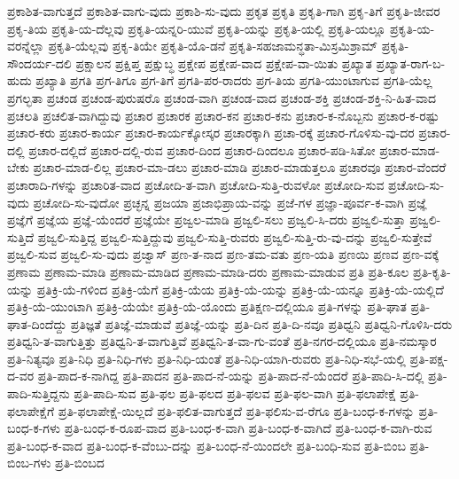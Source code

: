 {ಪ್ರಕಾಶಿತ-ವಾಗುತ್ತದೆ
ಪ್ರಕಾಶಿತ-ವಾಗು-ವುದು
ಪ್ರಕಾಶಿ-ಸು-ವುದು
ಪ್ರಕೃತ
ಪ್ರಕೃತಿ
ಪ್ರಕೃತಿ-ಗಾಗಿ
ಪ್ರಕೃ-ತಿಗೆ
ಪ್ರಕೃತಿ-ಜೀವರ
ಪ್ರಕೃ-ತಿಯ
ಪ್ರಕೃತಿ-ಯ-ದೆಲ್ಲವು
ಪ್ರಕೃತಿ-ಯನ್ನರಿ-ಯುವೆ
ಪ್ರಕೃತಿ-ಯನ್ನು
ಪ್ರಕೃತಿ-ಯಲ್ಲಿ
ಪ್ರಕೃತಿ-ಯಲ್ಲೂ
ಪ್ರಕೃತಿ-ಯ-ವರನ್ನೆಲ್ಲಾ
ಪ್ರಕೃತಿ-ಯೆಲ್ಲವು
ಪ್ರಕೃ-ತಿಯೇ
ಪ್ರಕೃತಿ-ಯೊ-ಡನೆ
ಪ್ರಕೃತಿ-ಸಹಜಾಮನ್ಧತಾ-ಮಿಸ್ರಮಿಶ್ರಾಮ್
ಪ್ರಕೃತಿ-ಸೌಂದರ್ಯ-ದಲಿ
ಪ್ರಕ್ಷಾಲನ
ಪ್ರಕ್ಷಿಪ್ತ
ಪ್ರಕ್ಷುಬ್ಧ
ಪ್ರಕ್ಷೇಪ
ಪ್ರಕ್ಷೇಪ-ವಾದ
ಪ್ರಕ್ಷೇಪ-ವಾ-ಯಿತು
ಪ್ರಖ್ಯಾತ
ಪ್ರಖ್ಯಾತ-ರಾಗ-ಬ-ಹುದು
ಪ್ರಖ್ಯಾತಿ
ಪ್ರಗತಿ
ಪ್ರಗ-ತಿಗೂ
ಪ್ರಗ-ತಿಗೆ
ಪ್ರಗತಿ-ಪರ-ರಾದರು
ಪ್ರಗ-ತಿಯ
ಪ್ರಗತಿ-ಯುಂಟಾಗುವ
ಪ್ರಗತಿ-ಯೆಲ್ಲ
ಪ್ರಗಲ್ಭತಾ
ಪ್ರಚಂಡ
ಪ್ರಚಂಡ-ಪುರುಷರೊ
ಪ್ರಚಂಡ-ವಾಗಿ
ಪ್ರಚಂಡ-ವಾದ
ಪ್ರಚಂಡ-ಶಕ್ತಿ
ಪ್ರಚಂಡ-ಶಕ್ತಿ-ನಿ-ಹಿತ-ವಾದ
ಪ್ರಚಲತಿ
ಪ್ರಚಲಿತ-ವಾಗಿದ್ದುವು
ಪ್ರಚಾರ
ಪ್ರಚಾರಕ
ಪ್ರಚಾರ-ಕನ
ಪ್ರಚಾರ-ಕನು
ಪ್ರಚಾರ-ಕ-ನೊಬ್ಬನು
ಪ್ರಚಾರ-ಕ-ರಷ್ಟು
ಪ್ರಚಾರ-ಕರು
ಪ್ರಚಾರ-ಕಾರ್ಯ
ಪ್ರಚಾರ-ಕಾರ್ಯಕ್ಕೋಸ್ಕರ
ಪ್ರಚಾರಕ್ಕಾಗಿ
ಪ್ರಚಾ-ರಕ್ಕೆ
ಪ್ರಚಾರ-ಗೊಳಿಸು-ವು-ದರ
ಪ್ರಚಾರ-ದಲ್ಲಿ
ಪ್ರಚಾರ-ದಲ್ಲಿದೆ
ಪ್ರಚಾರ-ದಲ್ಲಿ-ರುವ
ಪ್ರಚಾರ-ದಿಂದ
ಪ್ರಚಾರ-ದಿಂದಲೂ
ಪ್ರಚಾರ-ಪಡಿ-ಸಿತೋ
ಪ್ರಚಾರ-ಮಾಡ-ಬೇಕು
ಪ್ರಚಾರ-ಮಾಡ-ಲಿಲ್ಲ
ಪ್ರಚಾರ-ಮಾ-ಡಲು
ಪ್ರಚಾರ-ಮಾಡಿ
ಪ್ರಚಾರ-ಮಾಡುತ್ತಲೂ
ಪ್ರಚಾರವೂ
ಪ್ರಚಾರ-ವೆಂದರೆ
ಪ್ರಚಾರಾದಿ-ಗಳನ್ನು
ಪ್ರಚಾರಿತ-ವಾದ
ಪ್ರಚೋದಿ-ತ-ವಾಗಿ
ಪ್ರಚೋದಿ-ಸುತ್ತಿ-ರುವಳೋ
ಪ್ರಚೋದಿ-ಸುವ
ಪ್ರಚೋದಿ-ಸು-ವುದು
ಪ್ರಚೋದಿ-ಸು-ವುದೋ
ಪ್ರಚ್ಛನ್ನ
ಪ್ರಜಯಾ
ಪ್ರಜಾಭಿಪ್ರಾಯ-ವನ್ನು
ಪ್ರಜೆ-ಗಳ
ಪ್ರಜ್ಞಾ-ಪೂರ್ವ-ಕ-ವಾಗಿ
ಪ್ರಜ್ಞೆ
ಪ್ರಜ್ಞೆಗೆ
ಪ್ರಜ್ಞೆಯ
ಪ್ರಜ್ಞೆ-ಯೆಂದರೆ
ಪ್ರಜ್ಞೆಯೇ
ಪ್ರಜ್ವಲ-ಮಾಡಿ
ಪ್ರಜ್ವಲಿ-ಸಲು
ಪ್ರಜ್ವಲಿ-ಸಿ-ದರು
ಪ್ರಜ್ವಲಿ-ಸುತ್ತಾ
ಪ್ರಜ್ವಲಿ-ಸುತ್ತಿದೆ
ಪ್ರಜ್ವಲಿ-ಸುತ್ತಿದ್ದ
ಪ್ರಜ್ವಲಿ-ಸುತ್ತಿದ್ದುವು
ಪ್ರಜ್ವಲಿ-ಸುತ್ತಿ-ರುವರು
ಪ್ರಜ್ವಲಿ-ಸುತ್ತಿ-ರು-ವು-ದನ್ನು
ಪ್ರಜ್ವಲಿ-ಸುತ್ತೇವೆ
ಪ್ರಜ್ವಲಿ-ಸುವ
ಪ್ರಜ್ವಲಿ-ಸು-ವುದು
ಪ್ರಜ್ವಾಸ್
ಪ್ರಣ-ತ-ನಾದ
ಪ್ರಣ-ತಮ-ವತು
ಪ್ರಣ-ಯತಿ
ಪ್ರಣಯಿ
ಪ್ರಣವ
ಪ್ರಣ-ವಕ್ಕೆ
ಪ್ರಣಾಮ
ಪ್ರಣಾಮ-ಮಾಡಿ
ಪ್ರಣಾಮ-ಮಾಡಿದ
ಪ್ರಣಾಮ-ಮಾಡಿ-ದರು
ಪ್ರಣಾಮ-ಮಾಡುವ
ಪ್ರತಿ
ಪ್ರತಿ-ಕೂಲ
ಪ್ರತಿ-ಕೃತಿ-ಯನ್ನು
ಪ್ರತಿಕ್ರಿ-ಯೆ-ಗಳಿಂದ
ಪ್ರತಿಕ್ರಿ-ಯೆಗೆ
ಪ್ರತಿಕ್ರಿ-ಯೆಯ
ಪ್ರತಿಕ್ರಿ-ಯೆ-ಯನ್ನು
ಪ್ರತಿಕ್ರಿ-ಯೆ-ಯನ್ನೂ
ಪ್ರತಿಕ್ರಿ-ಯೆ-ಯಲ್ಲಿದೆ
ಪ್ರತಿಕ್ರಿ-ಯೆ-ಯುಂಟಾಗಿ
ಪ್ರತಿಕ್ರಿ-ಯೆಯೇ
ಪ್ರತಿಕ್ರಿ-ಯೆ-ಯೊಂದು
ಪ್ರತಿಕ್ಷಣ-ದಲ್ಲಿಯೂ
ಪ್ರತಿ-ಗಳನ್ನು
ಪ್ರತಿ-ಘಾತ
ಪ್ರತಿ-ಘಾತ-ದಿಂದೆದ್ದು
ಪ್ರತಿಜ್ಞತೆ
ಪ್ರತಿಜ್ಞೆ-ಮಾಡುವೆ
ಪ್ರತಿಜ್ಞೆ-ಯನ್ನು
ಪ್ರತಿ-ದಿನ
ಪ್ರತಿ-ದಿ-ನವೂ
ಪ್ರತಿಧ್ವನಿ
ಪ್ರತಿಧ್ವನಿ-ಗೊಳಿಸಿ-ದರು
ಪ್ರತಿಧ್ವನಿ-ತ-ವಾಗುತ್ತಿತ್ತು
ಪ್ರತಿಧ್ವನಿ-ತ-ವಾಗುತ್ತಿವೆ
ಪ್ರತಿಧ್ವನಿ-ತ-ವಾ-ಗು-ವಂತೆ
ಪ್ರತಿ-ನಗರ-ದಲ್ಲಿಯೂ
ಪ್ರತಿ-ನಮಸ್ಕಾರ
ಪ್ರತಿ-ನಿತ್ಯವೂ
ಪ್ರತಿ-ನಿಧಿ
ಪ್ರತಿ-ನಿಧಿ-ಗಳು
ಪ್ರತಿ-ನಿಧಿ-ಯಂತೆ
ಪ್ರತಿ-ನಿಧಿ-ಯಾಗಿ-ರುವರು
ಪ್ರತಿ-ನಿಧಿ-ಸಭೆ-ಯಲ್ಲಿ
ಪ್ರತಿ-ಪಕ್ಷ-ದ-ವರ
ಪ್ರತಿ-ಪಾದ-ಕ-ನಾಗಿದ್ದ
ಪ್ರತಿ-ಪಾದನ
ಪ್ರತಿ-ಪಾದ-ನೆ-ಯನ್ನು
ಪ್ರತಿ-ಪಾದ-ನೆ-ಯೆಂದರೆ
ಪ್ರತಿ-ಪಾದಿ-ಸಿ-ದಲ್ಲಿ
ಪ್ರತಿ-ಪಾದಿ-ಸುತ್ತಿದ್ದನು
ಪ್ರತಿ-ಪಾದಿ-ಸುವ
ಪ್ರತಿ-ಫಲ
ಪ್ರತಿ-ಫಲದ
ಪ್ರತಿ-ಫಲವ
ಪ್ರತಿ-ಫಲ-ವಾಗಿ
ಪ್ರತಿ-ಫಲಾಪೇಕ್ಷೆ
ಪ್ರತಿ-ಫಲಾಪೇಕ್ಷೆಗೆ
ಪ್ರತಿ-ಫಲಾಪೇಕ್ಷೆ-ಯಿಲ್ಲದೆ
ಪ್ರತಿ-ಫಲಿತ-ವಾಗುತ್ತದೆ
ಪ್ರತಿ-ಫಲಿಸು-ವ-ರೆಗೂ
ಪ್ರತಿ-ಬಂಧ-ಕ-ಗಳನ್ನು
ಪ್ರತಿ-ಬಂಧ-ಕ-ಗಳು
ಪ್ರತಿ-ಬಂಧ-ಕ-ರೂಪ-ವಾದ
ಪ್ರತಿ-ಬಂಧ-ಕ-ವಾಗಿ
ಪ್ರತಿ-ಬಂಧ-ಕ-ವಾಗಿದೆ
ಪ್ರತಿ-ಬಂಧ-ಕ-ವಾಗಿ-ರುವ
ಪ್ರತಿ-ಬಂಧ-ಕ-ವಾದ
ಪ್ರತಿ-ಬಂಧ-ಕ-ವೆಂಬು-ದನ್ನು
ಪ್ರತಿ-ಬಂಧ-ನೆ-ಯಿಂದಲೇ
ಪ್ರತಿ-ಬಂಧಿ-ಸುವ
ಪ್ರತಿ-ಬಿಂಬ
ಪ್ರತಿ-ಬಿಂಬ-ಗಳು
ಪ್ರತಿ-ಬಿಂಬದ
}
